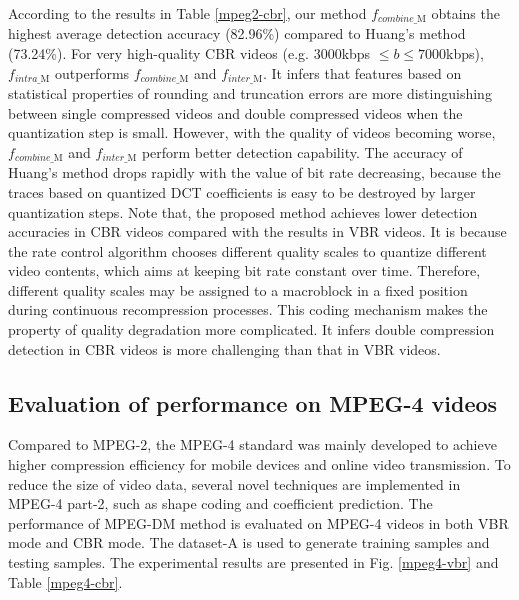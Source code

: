 \documentclass[journal,sort]{IEEEtran}
\begin{document}
According to the results in Table \ref{mpeg2-cbr}, our method $f_{combine\_\text{M}}$ obtains the highest average detection accuracy (82.96\%) compared to Huang's method (73.24\%). For very high-quality CBR videos (e.g. $3000$kbps $\leq b \leq 7000$kbps), $f_{intra\_\text{M}}$ outperforms $f_{combine\_\text{M}}$ and $f_{inter\_\text{M}}$. It infers that features based on statistical properties of rounding and truncation errors are more distinguishing between single compressed videos and double compressed videos when the quantization step is small. However, with the quality of videos becoming worse, $f_{combine\_\text{M}}$ and $f_{inter\_\text{M}}$ perform better detection capability. The accuracy of Huang's method drops rapidly with the value of bit rate decreasing, because the traces based on quantized DCT coefficients is easy to be destroyed by larger quantization steps.
Note that, the proposed method achieves lower detection accuracies in CBR videos compared with the results in VBR videos. It is because the rate control algorithm chooses different quality scales to quantize different video contents, which aims at keeping bit rate constant over time. Therefore, different quality scales may be assigned to a macroblock in a fixed position during continuous recompression processes. This coding mechanism makes the property of quality degradation more complicated. It infers double compression detection in CBR videos is more challenging than that in VBR videos.



\subsection{Evaluation of performance on MPEG-4 videos\label{evaluation_mpeg4}}
Compared to MPEG-2, the MPEG-4 standard was mainly developed to achieve higher compression efficiency for mobile devices and online video transmission. To reduce the size of video data, several novel techniques are implemented in MPEG-4 part-2, such as shape coding and coefficient prediction. The performance of MPEG-DM method is evaluated on MPEG-4 videos in both VBR mode and CBR mode. The dataset-A is used to generate training samples and testing samples. The experimental results are presented in Fig. \ref{mpeg4-vbr} and Table \ref{mpeg4-cbr}.
\end{document}
